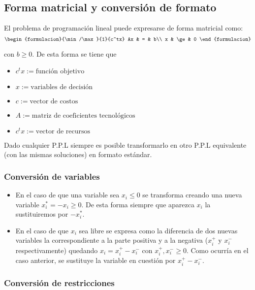 \subsection{Forma matricial y conversión de formato}

El problema de programación lineal puede expresarse de forma matricial como:
$$\begin{formulacion}{\min/\max}{1}{c^tx}
  Ax & = & b\\
  x & \ge & 0
\end{formulacion}$$

con $b\ge0$. De esta forma se tiene que

\begin{itemize}
  \item $c^tx:=\text{función objetivo}$
  \item $x:=\text{variables de decisión}$
  \item $c:=\text{vector de costos}$
  \item $A:=\text{matriz de coeficientes tecnológicos}$
  \item $c^tx:=\text{vector de recursos}$
\end{itemize}

Dado cualquier P.P.L siempre es posible transformarlo en otro P.P.L
equivalente (con las mismas soluciones) en formato estándar.

\subsubsection{Conversión de variables}

\begin{itemize}
  \item En el caso de que una variable sea $x_i\le0$ se transforma creando una nueva variable $x_i^*=-x_i\ge0$. De esta forma siempre que aparezca $x_i$ la sustituiremos por $-x_i^*$.
  
  \item En el caso de que $x_i$ sea libre se expresa como la diferencia de dos nuevas variables la correspondiente a la parte positiva y a la negativa ($x_i^+$ y $x_i^-$ respectivamente) quedando $x_i=x_i^+-x_i^-$ con $x_i^+,x_i^-\ge0$. Como ocurría en el caso anterior, se sustituye la variable en cuestión por $x_i^+-x_i^-$.
\end{itemize}

\subsubsection{Conversión de restricciones}

